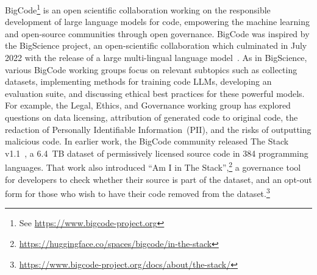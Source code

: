 \documentclass[10pt]{article} \usepackage{iclr2023_conference,times}
\begin{document}
BigCode\footnote{See \url{https://www.bigcode-project.org}} is an open scientific collaboration working on the responsible development of large language models for code, empowering the machine learning and open-source communities through open governance. BigCode was inspired by the BigScience project, an open-scientific collaboration which culminated in July 2022 with the release of a large multi-lingual language model~\citep{scao2022bloom}. As in BigScience, various BigCode working groups focus on relevant subtopics such as collecting datasets, implementing methods for training code LLMs, developing an evaluation suite, and discussing ethical best practices for these powerful models. For example, the Legal, Ethics, and Governance working group has explored questions on data licensing, attribution of generated code to original code, the redaction of Personally Identifiable Information~(PII), and the risks of outputting malicious code. In earlier work, the BigCode community released The Stack v1.1~\citep{Kocetkov2022TheStack}, a 6.4~TB dataset of permissively licensed source code in 384 programming languages. That work also introduced ``Am I in The Stack'',\footnote{\url{https://huggingface.co/spaces/bigcode/in-the-stack}} a governance tool for developers to check whether their source is part of the dataset, and an opt-out form for those who wish to have their code removed from the dataset.\footnote{\url{https://www.bigcode-project.org/docs/about/the-stack/}} 
\end{document}

